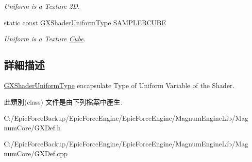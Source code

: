 \begin{DoxyCompactItemize}
\begin{DoxyCompactList}\small\item\em Uniform is a Texture 2D. \end{DoxyCompactList}\item 
static const \hyperlink{class_magnum_1_1_g_x_shader_uniform_type}{G\+X\+Shader\+Uniform\+Type} \hyperlink{class_magnum_1_1_g_x_shader_uniform_type_a2533b4a4e3274c5f30c5e5129719e02c}{S\+A\+M\+P\+L\+E\+R\+C\+U\+BE}\hypertarget{class_magnum_1_1_g_x_shader_uniform_type_a2533b4a4e3274c5f30c5e5129719e02c}{}\label{class_magnum_1_1_g_x_shader_uniform_type_a2533b4a4e3274c5f30c5e5129719e02c}

\begin{DoxyCompactList}\small\item\em Uniform is a Texture \hyperlink{class_magnum_1_1_cube}{Cube}. \end{DoxyCompactList}\end{DoxyCompactItemize}


\subsection{詳細描述}
\hyperlink{class_magnum_1_1_g_x_shader_uniform_type}{G\+X\+Shader\+Uniform\+Type} encapsulate Type of Uniform Variable of the Shader. 

此類別(class) 文件是由下列檔案中產生\+:\begin{DoxyCompactItemize}
\item 
C\+:/\+Epic\+Force\+Backup/\+Epic\+Force\+Engine/\+Epic\+Force\+Engine/\+Magnum\+Engine\+Lib/\+Magnum\+Core/G\+X\+Def.\+h\item 
C\+:/\+Epic\+Force\+Backup/\+Epic\+Force\+Engine/\+Epic\+Force\+Engine/\+Magnum\+Engine\+Lib/\+Magnum\+Core/G\+X\+Def.\+cpp\end{DoxyCompactItemize}
